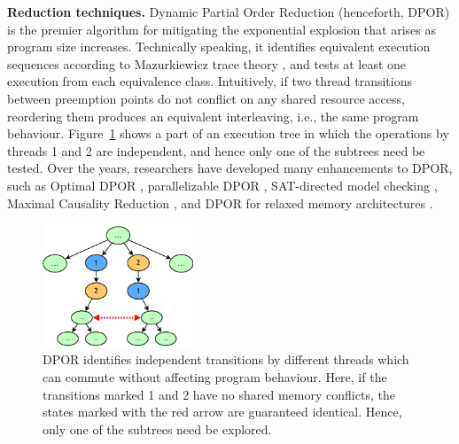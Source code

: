 {\bf Reduction techniques.}
Dynamic Partial Order Reduction \cite{dpor} (henceforth, DPOR) is the premier algorithm for mitigating the exponential explosion that arises as program size increases.
Technically speaking, it identifies equivalent execution sequences according to Mazurkiewicz trace theory \cite{mazurkiewicz},
and tests at least one execution from each equivalence class.
Intuitively, if two thread transitions between preemption points do not conflict on any shared resource access, reordering them produces an equivalent interleaving, i.e., the same program behaviour.
Figure~\ref{fig:dpor} shows a part of an execution tree in which the operations by threads 1 and 2 are independent, and hence only one of the subtrees need be tested.
Over the years, researchers have developed many enhancements to DPOR, such as Optimal DPOR \cite{optimal-dpor}, parallelizable DPOR \cite{parallel-dpor}, SAT-directed model checking \cite{satcheck}, Maximal Causality Reduction \cite{mcr}, and DPOR for relaxed memory architectures \cite{tsopso}.

\begin{figure}[t]
	\begin{center}
	\includegraphics[width=0.4\textwidth]{dpor.pdf}
	\end{center}
	\caption{DPOR identifies independent transitions by different threads which can commute without affecting program behaviour. Here, if the transitions marked 1 and 2 have no shared memory conflicts, the states marked with the red arrow are guaranteed identical. Hence, only one of the subtrees need be explored.}
	\label{fig:dpor}
\end{figure}

